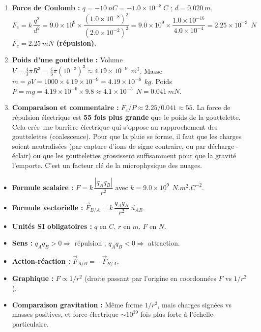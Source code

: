 \documentclass[11pt]{article}
\begin{document}
\begin{corrige}[Exercice 1]
\begin{enumerate}
    \item \textbf{Force de Coulomb :}
    $q = -\num{10}\ nC = -\num{1,0} \times 10^{-8}\ C$ ; $d = \num{0,020}\ m$.
    \[
    F_e = k\,\frac{q^2}{d^2} = \num{9,0} \times 10^9 \times \frac{(\num{1,0} \times 10^{-8})^2}{(\num{2,0} \times 10^{-2})^2} = \num{9,0} \times 10^9 \times \frac{\num{1,0} \times 10^{-16}}{\num{4,0} \times 10^{-4}} = \num{2,25} \times 10^{-3}\ \SI{}{N}
    \]
    \textbf{$F_e = \num{2,25}\ mN$ (répulsion).}
    \item \textbf{Poids d'une gouttelette :}
    Volume $V = \frac{4}{3}\pi R^3 = \frac{4}{3}\pi (10^{-3})^3 \approx \num{4,19} \times 10^{-9}\ \SI{}{m^3}$.
    Masse $m = \rho V = \num{1000} \times \num{4,19} \times 10^{-9} = \num{4,19} \times 10^{-6}\ \SI{}{kg}$.
    Poids $P = mg = \num{4,19} \times 10^{-6} \times \num{9,8} \approx \num{4,1} \times 10^{-5}\ \SI{}{N} = \num{0,041}\ mN$.
    \item \textbf{Comparaison et commentaire :}
    $F_e / P \approx \num{2,25} / \num{0,041} \approx 55$. La force de répulsion électrique est \textbf{55 fois plus grande} que le poids de la gouttelette.
    Cela crée une barrière électrique qui s'oppose au rapprochement des gouttelettes (coalescence). Pour que la pluie se forme, il faut que les charges soient neutralisées (par capture d'ions de signe contraire, ou par décharge - éclair) ou que les gouttelettes grossissent suffisamment pour que la gravité l'emporte. C'est un facteur clé de la microphysique des nuages.
\end{enumerate}
\end{corrige}

\begin{aretenir}
\begin{itemize}
    \item \textbf{Formule scalaire :} $F = k\,\dfrac{|q_A q_B|}{r^2}$ avec $k = \num{9,0} \times 10^9\ \SI{}{N.m^2.C^{-2}}$.
    \item \textbf{Formule vectorielle :} $\vec{F}_{B/A} = k\,\dfrac{q_A q_B}{r^2}\,\vec{u}_{AB}$.
    \item \textbf{Unités SI obligatoires :} $q$ en $C$, $r$ en $m$, $F$ en $N$.
    \item \textbf{Sens :} $q_A q_B > 0 \Rightarrow$ répulsion ; $q_A q_B < 0 \Rightarrow$ attraction.
    \item \textbf{Action-réaction :} $\vec{F}_{A/B} = -\vec{F}_{B/A}$.
    \item \textbf{Graphique :} $F \propto 1/r^2$ (droite passant par l'origine en coordonnées $F$ vs $1/r^2$).
    \item \textbf{Comparaison gravitation :} Même forme $1/r^2$, mais charges signées vs masses positives, et force électrique $\sim 10^{39}$ fois plus forte à l'échelle particulaire.
\end{itemize}
\end{aretenir}
\end{document}
